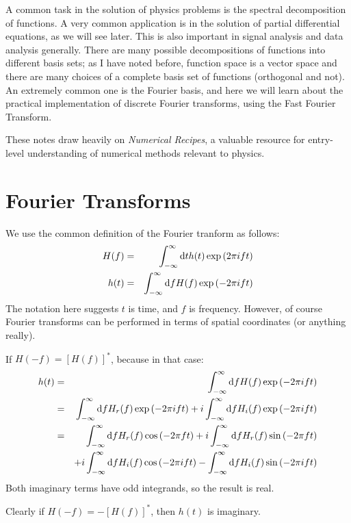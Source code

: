 
A common task in the solution of physics problems is the spectral
decomposition of functions. A very common application is in the
solution of partial differential equations, as we will see later. This
is also important in signal analysis and data analysis
generally. There are many possible decompositions of functions into
different basis sets; as I have noted before, function space is a
vector space and there are many choices of a complete basis set of
functions (orthogonal and not).  An extremely common one is the
Fourier basis, and here we will learn about the practical
implementation of discrete Fourier transforms, using the Fast Fourier
Transform.

These notes draw heavily on {\it Numerical Recipes}, a valuable
resource for entry-level understanding of numerical methods relevant
to physics.

\section{Fourier Transforms}

We use the common definition of the Fourier tranform as follows:
\begin{eqnarray}
H(f) &=& \int_{-\infty}^{\infty} {\rm d}t h(t) \exp\left(2\pi i f t\right) \cr
h(t) &=& \int_{-\infty}^{\infty} {\rm d}f H(f) \exp\left(- 2\pi i f t\right)
\end{eqnarray}
The notation here suggests $t$ is time, and $f$ is frequency. However,
of course Fourier transforms can be performed in terms of spatial
coordinates (or anything really).


\begin{answer}
If $H(-f) =  [H(f)]^\ast$, because in that case:
\begin{eqnarray}
h(t) &=& \int_{-\infty}^{\infty} {\rm d}f H(f) \exp\left(- 2\pi i f t\right) \cr
&=& \int_{-\infty}^{\infty} {\rm d}f H_r(f) \exp\left(- 2\pi i f t\right)
+ i \int_{-\infty}^{\infty} {\rm d}f H_i(f) \exp\left(- 2\pi i f
t\right) \cr
&=& \int_{-\infty}^{\infty} {\rm d}f H_r(f) \cos\left(- 2\pi f t\right)
+ i \int_{-\infty}^{\infty} {\rm d}f H_r(f) \sin\left(- 2\pi f
t\right) \cr
&& + i \int_{-\infty}^{\infty} {\rm d}f H_i(f) \cos\left(- 2\pi i f t\right)
- \int_{-\infty}^{\infty} {\rm d}f H_i(f) \sin\left(- 2\pi i f t\right)
\end{eqnarray}
Both imaginary terms have odd integrands, so the result is real.

Clearly if $H(-f) = -[H(f)]^\ast$, then $h(t)$ is imaginary. 
\end{answer}

